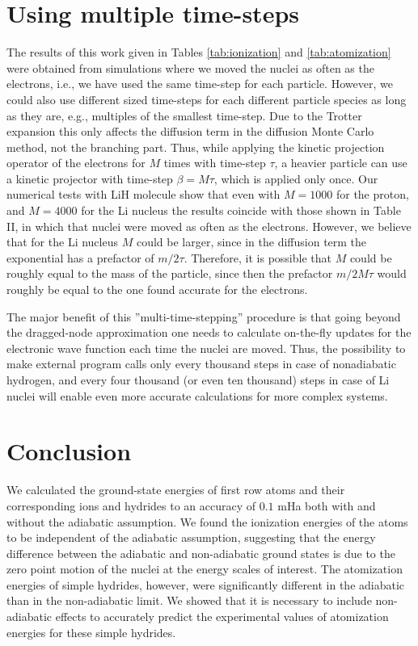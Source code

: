 \documentclass[pra,superscriptaddress,groupedaddress,twocolumn]{revtex4}
\begin{document}


\section{Using multiple time-steps}
The results of this work given in Tables \ref{tab:ionization} and \ref{tab:atomization} were obtained from simulations where we moved the nuclei as often as the electrons, i.e., we have used the same time-step for each particle. However, we could also use different sized time-steps for each different particle species as long as they are, e.g., multiples of the smallest time-step. Due to the Trotter expansion \cite{lester1} this only affects the diffusion term in the diffusion Monte Carlo method, not the branching part. Thus, while applying the kinetic projection operator of the electrons for $M$ times with time-step $\tau$, a heavier particle can use a kinetic projector with time-step $\beta=M\tau$, which is applied only once. Our numerical tests with LiH molecule show that even with $M=1000$ for the proton, and $M=4000$ for the Li nucleus the results coincide with those shown in Table II, in which that nuclei were moved as often as the electrons. However, we believe that for the Li nucleus $M$ could be larger, since in the diffusion term the exponential has a prefactor of $m/2\tau$. Therefore, it is possible that $M$ could be roughly equal to the mass of the particle, since then the prefactor $m/2M\tau$ would roughly be equal to the one found accurate for the electrons.

The major benefit of this ''multi-time-stepping'' procedure is that going beyond the dragged-node approximation one needs to calculate on-the-fly updates for the electronic wave function each time the nuclei are moved. Thus, the possibility to make external program calls only every thousand steps in case of nonadiabatic hydrogen, and every four thousand (or even ten thousand) steps in case of Li nuclei will enable even more accurate calculations for more complex systems.


\section{Conclusion}
We calculated the ground-state energies of first row atoms and their corresponding ions and hydrides to an accuracy of $0.1$ mHa both with and without the adiabatic assumption. We found the ionization energies of the atoms to be independent of the adiabatic assumption, suggesting that the energy difference between the adiabatic and non-adiabatic ground states is due to the zero point motion of the nuclei at the energy scales of interest. The atomization energies of simple hydrides, however, were significantly different in the adiabatic than in the non-adiabatic limit.   We showed that it is necessary to include non-adiabatic effects to accurately predict the experimental values of atomization energies for these simple hydrides.
\end{document}
